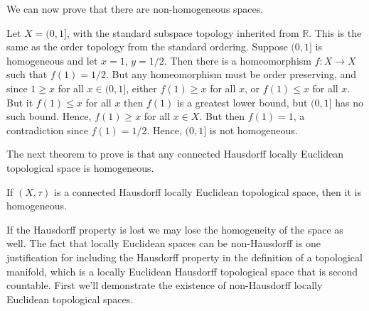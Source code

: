 \documentclass[oneside]{book}                                                  %
\begin{document}
            We can now prove that there are non-homogeneous spaces.
            \begin{example}
                Let $X=(0,1]$, with the standard subspace topology inherited
                from $\mathbb{R}$. This is the same as the order topology from
                the standard ordering. Suppose $(0,1]$ is homogeneous and let
                $x=1$, $y=1/2$. Then there is a homeomorphism
                $f:X\rightarrow{X}$ such that $f(1)=1/2$. But any homeomorphism
                must be order preserving, and since $1\geq{x}$ for all
                $x\in(0,1]$, either $f(1)\geq{x}$ for all $x$, or $f(1)\leq{x}$
                for all $x$. But it $f(1)\leq{x}$ for all $x$ then $f(1)$ is a
                greatest lower bound, but $(0,1]$ has no such bound. Hence,
                $f(1)\geq{x}$ for all $x\in{X}$. But then $f(1)=1$, a
                contradiction since $f(1)=1/2$. Hence, $(0,1]$ is not
                homogeneous.
            \end{example}
            The next theorem to prove is that any connected Hausdorff locally
            Euclidean topological space is homogeneous.
            \begin{theorem}
                If $(X,\tau)$ is a connected Hausdorff locally Euclidean
                topological space, then it is homogeneous.
            \end{theorem}
            If the Hausdorff property is lost we may lose the homogeneity of the
            space as well. The fact that locally Euclidean spaces can be
            non-Hausdorff is one justification for including the Hausdorff
            property in the definition of a topological manifold, which is a
            locally Euclidean Hausdorff topological space that is second
            countable. First we'll demonstrate the existence of non-Hausdorff
            locally Euclidean topological spaces.
\end{document}
